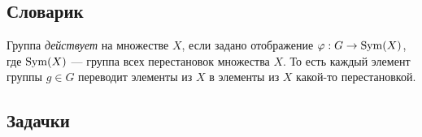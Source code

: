 \documentclass[10pt]{article}
\begin{document}
\subsection*{Словарик}



Группа \emph{действует} на множестве $X$, если задано отображение $\varphi: G \to \mathrm{Sym}\small(X)$, где $\mathrm{Sym}\small(X)$ --- группа всех перестановок множества $X$. То есть каждый элемент группы $g \in G$ переводит элементы из $X$ в элементы из $X$ какой-то перестановкой. 


\subsection*{Задачки}

\end{document}
